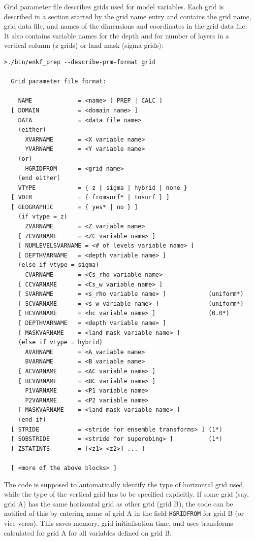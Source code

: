 \documentclass[11pt]{report}
\begin{document}
Grid parameter file describes grids used for model variables.
Each grid is described in a section started by the grid name entry and contains the grid name, grid data file, and names of the dimensions and coordinates in the grid data file.
It also contains variable names for the depth and for number of layers in a vertical column (z grids) or land mask (sigma grids):
\begin{Verbatim}[frame=single,fontsize=\footnotesize]
>./bin/enkf_prep --describe-prm-format grid

  Grid parameter file format:

    NAME             = <name> [ PREP | CALC ]
  [ DOMAIN           = <domain name> ]
    DATA             = <data file name>
    (either)
      XVARNAME       = <X variable name>
      YVARNAME       = <Y variable name>
    (or)
      HGRIDFROM      = <grid name>
    (end either)
    VTYPE            = { z | sigma | hybrid | none }
  [ VDIR             = { fromsurf* | tosurf } ]
  [ GEOGRAPHIC       = { yes* | no } ]
    (if vtype = z)
      ZVARNAME       = <Z variable name>
    [ ZCVARNAME      = <ZC variable name> ]
    [ NUMLEVELSVARNAME = <# of levels variable name> ]
    [ DEPTHVARNAME   = <depth variable name> ]
    (else if vtype = sigma)
      CVARNAME       = <Cs_rho variable name>
    [ CCVARNAME      = <Cs_w variable name> ]
    [ SVARNAME       = <s_rho variable name> ]            (uniform*)
    [ SCVARNAME      = <s_w variable name> ]              (uniform*)
    [ HCVARNAME      = <hc variable name> ]               (0.0*)
    [ DEPTHVARNAME   = <depth variable name> ]
    [ MASKVARNAME    = <land mask variable name> ]
    (else if vtype = hybrid)
      AVARNAME       = <A variable name>
      BVARNAME       = <B variable name>
    [ ACVARNAME      = <AC variable name> ]
    [ BCVARNAME      = <BC variable name> ]
      P1VARNAME      = <P1 variable name>
      P2VARNAME      = <P2 variable name>
    [ MASKVARNAME    = <land mask variable name> ]
    (end if)
  [ STRIDE           = <stride for ensemble transforms> ] (1*)
  [ SOBSTRIDE        = <stride for superobing> ]          (1*)
  [ ZSTATINTS        = [<z1> <z2>] ... ]

  [ <more of the above blocks> ]
\end{Verbatim}

The code is supposed to automatically identify the type of horizontal grid used, while the type of the vertical grid has to be specified explicitly.
If some grid (say, grid A) has the same horizontal grid as other grid (grid B), the code can be notified of this by entering name of grid A in the field \verb|HGRIDFROM| for grid B (or vice versa).
This saves memory, grid initialisation time, and uses transforms calculated for grid A for all variables defined on grid B.
\end{document}
